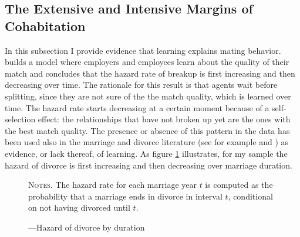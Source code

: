 \documentclass[12pt]{article}
\begin{document}
\subsection{The Extensive and Intensive Margins of Cohabitation}
In this subsection I provide evidence that learning explains mating behavior. \citet{jovanovic1979} builds a model where employers and employees learn about the quality of their match and concludes that the hazard rate of breakup is first increasing and then decreasing over time. The rationale for this result is that agents wait before splitting, since they are not sure of the the match quality, which is learned over time. The hazard rate starts decreasing at a certain moment because of a self-selection effect: the relationships that have not broken up yet are the ones with the best match quality. The presence or absence of this pattern in the data has been used also in the marriage and divorce literature (see for example \cite{brien2006} and \cite{marinescu2016}) as evidence, or lack thereof, of learning. As figure \ref{fig:hazard} illustrates, for my sample the hazard of divorce is first increasing and then decreasing over marriage duration.
\begin{figure}[h!]
	\centering
	\caption{---Hazard of divorce by duration}
	\label{fig:hazard}
	\hspace*{-1.1cm} 
	\resizebox{0.9\textwidth}{!}{}
	\begin{minipage}{0.99\textwidth} %
		
		\hspace{30em}
		
		{\scriptsize  \textsc{Notes.}  The hazard rate for each marriage year $t$ is computed as the probability that a marriage ends in divorce in interval $t$, conditional on not having divorced until $t$.\par}
	\end{minipage}
\end{figure}
\end{document}
